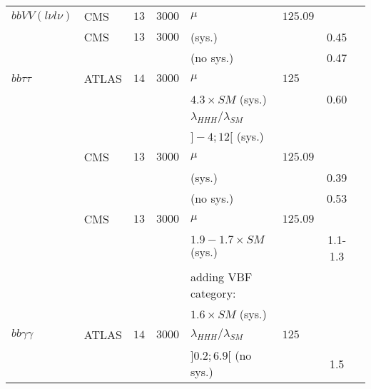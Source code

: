 \begin{table}[h!]
\begin{center}
\begin{tabular}{|l|l|c|c|l|l|c|c|}
\hline
$bb VV (l\nu l\nu)$        &CMS            &$13$        &$3000$        &$\mu$                &$125.09$    &    &\cite{CMS:2017cwx}\\
                &CMS            &$13$        &$3000$        &(sys.)                &    &0.45    &\\
                &            &        &        &(no sys.)            &        &0.47    &\\
\hline
$bb \tau\tau$            &ATLAS            &$14$        &$3000$        &$\mu$                  &$125$         &    &\cite{prospects_HL_LHC_HH_bb_tautau}\\
                &            &        &        &$4.3\times SM$ (sys.)         &         &0.60    &\\
                &            &        &        &$\lambda_{HHH}/\lambda_{SM}$     &         &    &\\
                &            &        &        &$]-4 ; 12[$ (sys.)          &         &    &\\
\cline{2-8}
                &CMS            &$13$        &$3000$        &$\mu$                &$125.09$    &    &\cite{CMS:2017cwx}\\
                &            &        &        &(sys.)                &        &0.39    &\\
                &            &        &        &(no sys.)            &        &0.53    &\\
\cline{2-8}
                &CMS            &$13$        &$3000$        &$\mu$                &$125.09$    &    &\cite{Collaboration:2293646}\\
                &            &        &        &$1.9-1.7\times SM$ (sys.)    &        &1.1-1.3    &\\
                &            &        &        &adding VBF category:        &        &        &\\
                &            &        &        &$1.6\times SM$ (sys.)        &        &        &\\
\hline
$bb \gamma\gamma$        &ATLAS            &$14$        &$3000$        &$\lambda_{HHH}/\lambda_{SM}$    &$125$        &    &\cite{Collaboration:2285585}\\
                &            &        &        &$]0.2 ; 6.9[$ (no sys.)    &        &1.5    &\\


\end{tabular}
\end{center}
\end{table}
